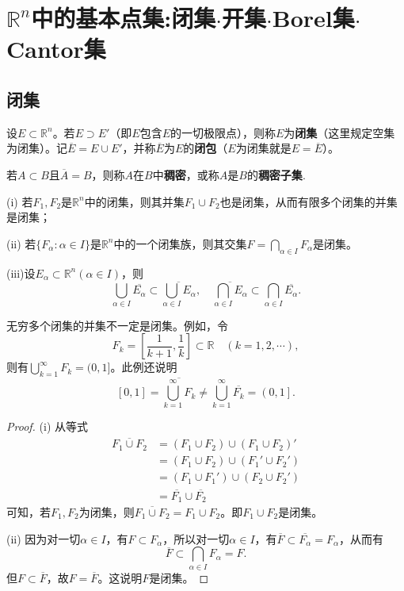 \documentclass[../../main.tex]{subfiles}
\begin{document}
\section{$\mathbb{R}^n$中的基本点集:闭集$\cdot$开集$\cdot$Borel集$\cdot$Cantor集}

\subsection{闭集}

\begin{definition}[闭集与闭包]\label{definition:闭集与闭包}
设\(E\subset\mathbb{R}^n\)。若\(E\supset E'\)（即\(E\)包含\(E\)的一切极限点），则称\(E\)为\textbf{闭集}（这里规定空集为闭集）。记\(\overline{E}=E\cup E'\)，并称\(\overline{E}\)为\(E\)的\textbf{闭包}（\(E\)为闭集就是\(E = \overline{E}\)）。
\end{definition}

\begin{definition}[稠密子集]\label{definition:稠密子集}
  若\(A\subset B\)且\(\overline{A}=B\)，则称\(A\)在\(B\)中\textbf{稠密}，或称\(A\)是\(B\)的\textbf{稠密子集}.
\end{definition}

\begin{theorem}[闭集的运算性质]\label{theorem:闭集的运算性质}
  (i) 若\(F_1,F_2\)是\(\mathbb{R}^n\)中的闭集，则其并集\(F_1\cup F_2\)也是闭集，从而有限多个闭集的并集是闭集；

(ii) 若\(\{F_{\alpha}:\alpha\in I\}\)是\(\mathbb{R}^n\)中的一个闭集族，则其交集\(F = \bigcap_{\alpha\in I}F_{\alpha}\)是闭集。

(iii)设\(E_{\alpha}\subset\mathbb{R}^n(\alpha\in I)\)，则
\[\bigcup_{\alpha\in I}\overline{E_{\alpha}}\subset\overline{\bigcup_{\alpha\in I}E_{\alpha}},\quad\overline{\bigcap_{\alpha\in I}E_{\alpha}}\subset\bigcap_{\alpha\in I}\overline{E_{\alpha}}.\]
\end{theorem}
\begin{remark}
  无穷多个闭集的并集不一定是闭集。例如，令
\[F_k=\left[\frac{1}{k + 1},\frac{1}{k}\right]\subset\mathbb{R}\quad(k = 1,2,\cdots),\]
则有\(\bigcup_{k = 1}^{\infty}F_k=(0,1]\)。此例还说明
\[\left[ 0,1 \right] =\overline{\bigcup_{k=1}^{\infty}{F_k}}\ne \bigcup_{k=1}^{\infty}{\overline{F_k}}=\left( 0,1 \right] .\]
\end{remark}
\begin{proof}
  (i) 从等式
\begin{align*}
\overline{F_1\cup F_2}&=(F_1\cup F_2)\cup (F_1\cup F_2)'\\
&=(F_1\cup F_2)\cup (F_1'\cup F_2')\\
&=(F_1\cup F_1')\cup (F_2\cup F_2')\\
&=\overline{F_1}\cup\overline{F_2}
\end{align*}
可知，若\(F_1,F_2\)为闭集，则\(\overline{F_1\cup F_2}=F_1\cup F_2\)。即\(F_1\cup F_2\)是闭集。

(ii) 因为对一切\(\alpha\in I\)，有\(F\subset F_{\alpha}\)，所以对一切\(\alpha\in I\)，有\(\overline{F}\subset\overline{F_{\alpha}} = F_{\alpha}\)，从而有
\[\overline{F}\subset\bigcap_{\alpha\in I}F_{\alpha}=F.\]
但\(F\subset\overline{F}\)，故\(F=\overline{F}\)。这说明\(F\)是闭集。
\end{proof}
\end{document}
